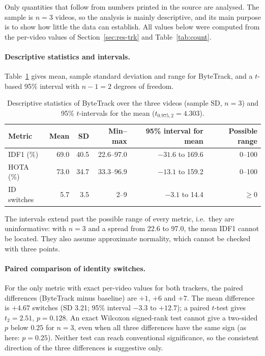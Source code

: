 \documentclass[11pt,a4paper]{article}
\begin{document}
Only quantities that follow from numbers printed in the source are analysed. The sample is $n=3$ videos, so the analysis is mainly descriptive, and its main purpose is to show how little the data can establish. All values below were computed from the per-video values of Section~\ref{sec:res-trk} and Table~\ref{tab:count}.

\paragraph{Descriptive statistics and intervals.} Table~\ref{tab:desc} gives mean, sample standard deviation and range for ByteTrack, and a $t$-based 95\% interval with $n-1=2$ degrees of freedom.

\begin{table}[t]
\caption{Descriptive statistics of ByteTrack over the three videos (sample SD, $n=3$) and 95\% $t$-intervals for the mean ($t_{0.975,2}=4.303$).}\label{tab:desc}
\centering\small
\begin{tabular}{lrrrrr}
\toprule
Metric & Mean & SD & Min--max & 95\% interval for mean & Possible range\\
\midrule
IDF1 (\%) & 69.0 & 40.5 & 22.6--97.0 & $-31.6$ to 169.6 & 0--100\\
HOTA (\%) & 73.0 & 34.7 & 33.3--96.9 & $-13.1$ to 159.2 & 0--100\\
ID switches & 5.7 & 3.5 & 2--9 & $-3.1$ to 14.4 & $\ge0$\\
\bottomrule
\end{tabular}
\end{table}

The intervals extend past the possible range of every metric, i.e.\ they are uninformative: with $n=3$ and a spread from 22.6 to 97.0, the mean IDF1 cannot be located. They also assume approximate normality, which cannot be checked with three points.

\paragraph{Paired comparison of identity switches.} For the only metric with exact per-video values for both trackers, the paired differences (ByteTrack minus baseline) are $+1$, $+6$ and $+7$. The mean difference is $+4.67$ switches (SD 3.21; 95\% interval $-3.3$ to $+12.7$); a paired $t$-test gives $t_2=2.51$, $p=0.128$. An exact Wilcoxon signed-rank test cannot give a two-sided $p$ below $0.25$ for $n=3$, even when all three differences have the same sign (as here: $p=0.25$). Neither test can reach conventional significance, so the consistent direction of the three differences is suggestive only.
\end{document}
